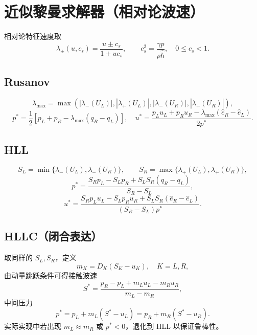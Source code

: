 \section{近似黎曼求解器（相对论波速）}

相对论特征速度取
\begin{equation}
\lambda_{\pm}(u,c_s)=\frac{u\pm c_s}{1\pm uc_s},\qquad
c_s^2=\frac{\gamma p}{\rho\hat{h}},\quad 0\le c_s<1.
\end{equation}

\subsection{Rusanov}
\begin{equation}
\lambda_{\max}=
\max\!\left(|\lambda_-(U_L)|,|\lambda_+(U_L)|,|\lambda_-(U_R)|,|\lambda_+(U_R)|\right),
\end{equation}
\begin{equation}
p^*=\frac12\!\left[p_L+p_R-\lambda_{\max}(q_R-q_L)\right],\quad
u^*=\frac{p_Lu_L+p_Ru_R-\lambda_{\max}(\hat{e}_R-\hat{e}_L)}{2p^*}.
\end{equation}

\subsection{HLL}
\begin{equation}
S_L=\min\{\lambda_-(U_L),\lambda_-(U_R)\},\qquad
S_R=\max\{\lambda_+(U_L),\lambda_+(U_R)\},
\end{equation}
\begin{equation}
p^*=\frac{S_Rp_L-S_Lp_R+S_LS_R(q_R-q_L)}{S_R-S_L},
\end{equation}
\begin{equation}
u^*=
\frac{S_Rp_Lu_L-S_Lp_Ru_R+S_LS_R(\hat{e}_R-\hat{e}_L)}
{(S_R-S_L)p^*}.
\end{equation}

\subsection{HLLC（闭合表达）}
取同样的 $S_L,S_R$，定义
\begin{equation}
m_K=D_K(S_K-u_K),\quad K=L,R,
\end{equation}
由动量跳跃条件可得接触波速
\begin{equation}
S^*=\frac{p_R-p_L+m_Lu_L-m_Ru_R}{m_L-m_R},
\end{equation}
中间压力
\begin{equation}
p^*=p_L+m_L(S^*-u_L)=p_R+m_R(S^*-u_R).
\end{equation}
实际实现中若出现 $m_L\approx m_R$ 或 $p^*<0$，退化到 HLL 以保证鲁棒性。

